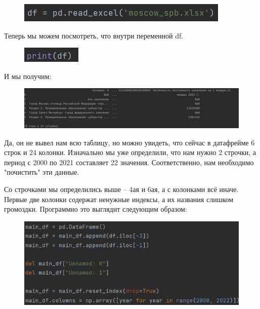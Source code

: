 \begin{figure}[H]
	\begin{center}
		\includegraphics{include/fig/readexcel}
	\end{center}
\end{figure}

Теперь мы можем посмотреть, что внутри переменной df.

\begin{figure}[H]
	\begin{center}
		\includegraphics{include/fig/printdf}
	\end{center}
\end{figure}

И мы получим:

\begin{figure}[H]
	\begin{center}
		\includegraphics[scale=0.65]{include/fig/print}
	\end{center}
\end{figure}

Да, он не вывел нам всю таблицу, но можно увидеть, что сейчас в датафрейме 6 строк и 24 колонки. Изначально мы уже определили, что нам нужно 2 строчки, а период с 2000 по 2021 составляет 22 значения. Соответственно, нам необходимо "почистить" эти данные.

Со строчками мы определились выше -- 4ая и 6ая, а с колонками всё иначе. Первые две колонки содержат ненужные индексы, а их названия слишком громоздки. Программно это выглядит следующим образом:

\begin{figure}[H]
	\begin{center}
		\includegraphics{include/fig/maindf}
	\end{center}
\end{figure}


